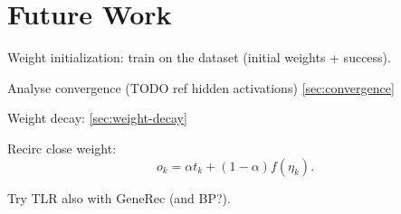 
\section*{Future Work} 
Weight initialization: train on the dataset (initial weights + success). 

Analyse convergence 
(TODO ref hidden activations) \ref{sec:convergence} 

Weight decay: 
\ref{sec:weight-decay} 

Recirc close weight: 
\begin{equation}
o_k = \alpha t_k + (1-\alpha)f(\eta_k). 
\end{equation} 

Try TLR also with GeneRec (and BP?).  \\ 

